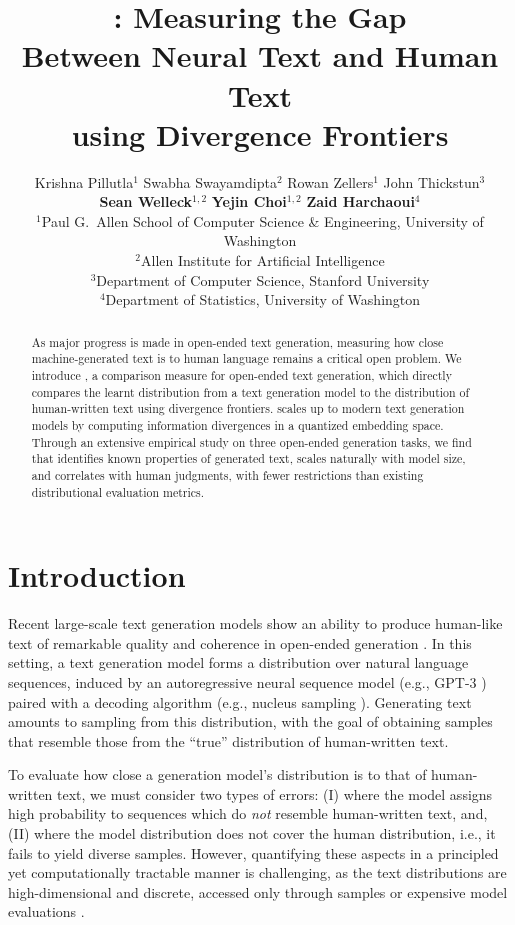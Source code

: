 \documentclass{article}
\title{\name: Measuring the Gap \\ Between Neural Text and Human Text \\ using Divergence Frontiers}
\author{
Krishna Pillutla$^{1}$\quad 
Swabha Swayamdipta$^{2}$\quad 
Rowan Zellers$^{1}$\quad
John Thickstun$^{3}$\quad \\
\textbf{Sean Welleck}$^{1,2}$ \quad
\textbf{Yejin Choi}$^{1,2}$\quad
\textbf{Zaid Harchaoui}$^{4}$
\vspace{0.3cm}\\
  $^{1}$Paul G.\ Allen School of Computer Science \& Engineering, University of Washington \\
  $^{2}$Allen Institute for Artificial Intelligence\\
  $^{3}$Department of Computer Science, Stanford University \\
  $^{4}$Department of Statistics, University of Washington
%
}
\theoremstyle{definition}
\newcommand{\name}{{\fontfamily{bch}\selectfont{\textsc{Mauve}}}\xspace}
\begin{document}
\maketitle
\doparttoc %
\faketableofcontents %

%
\begin{abstract}
As major progress is made in open-ended text generation, measuring how close machine-generated text is to human language remains a critical open problem.
We introduce \name, a comparison measure for open-ended text generation, which directly compares the learnt distribution from a text generation model to the distribution of human-written text using divergence frontiers. 
\name scales up to modern text generation models by computing information divergences in a quantized embedding space.
Through an extensive empirical study on three open-ended generation tasks, we find that \name identifies known properties of generated text, scales naturally with model size, and correlates with human judgments, with fewer restrictions than existing distributional evaluation metrics.
\end{abstract} %
%
%
\section{Introduction}
\label{sec:intro}
%
Recent large-scale text generation models show an ability to produce human-like text of remarkable quality and coherence in open-ended generation  \cite{radford2019language,zellers2019grover,brown2020language}.
In this setting, a text generation model forms a distribution over natural language sequences, induced by an autoregressive neural sequence model (e.g., GPT-3 \citep{brown2020language}) paired with a decoding algorithm (e.g., nucleus sampling \citep{holtzman2019curious}).
Generating text amounts to sampling from this distribution, with the goal of obtaining samples that resemble those from the ``true'' distribution of human-written text.

To evaluate how close a generation model's distribution is to that of human-written text, we must consider two types of errors: (I) where the model assigns high probability to sequences which do {\em not} resemble human-written text, and, (II) where the model distribution does not cover the human distribution, i.e., it fails to yield diverse samples.
However, quantifying these aspects in a principled yet computationally tractable manner is challenging, as the text distributions are high-dimensional and discrete, accessed only through samples or expensive model evaluations
%
%
%
\citep{holtzman2019curious,welleck2020consistency,zhang2020trading}.
\end{document}
